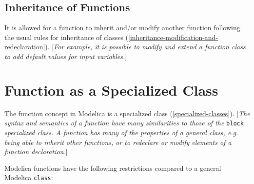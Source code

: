 \subsection{Inheritance of Functions}

It is allowed for a function to inherit and/or modify another function
following the usual rules for inheritance of classes (\autoref{inheritance-modification-and-redeclaration}).
{[}\emph{For example, it is possible to modify and extend a function
class to add default values for input variables.}{]}

\section{Function as a Specialized Class}

The function concept in Modelica is a specialized class (\autoref{specialized-classes}).
{[}\emph{The syntax and semantics of a function have many similarities
to those of the} \lstinline!block! \emph{specialized class. A function has many of the
properties of a general class, e.g. being able to inherit other
functions, or to redeclare or modify elements of a function
declaration.}{]}

Modelica functions have the following restrictions compared to a general
Modelica \lstinline!class!:

